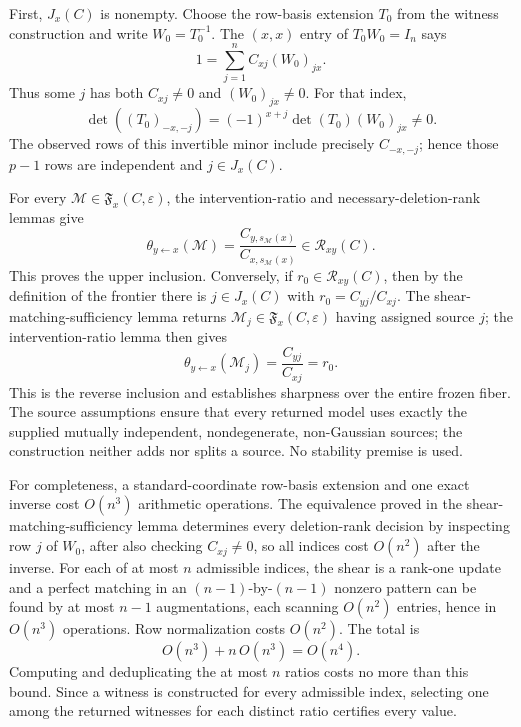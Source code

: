 First, \(J_x(C)\) is nonempty. Choose the row-basis extension \(T_0\) from the witness construction and write \(W_0=T_0^{-1}\). The \((x,x)\) entry of \(T_0W_0=I_n\) says
\[
 1=\sum_{j=1}^n C_{xj}(W_0)_{jx}.
\]
Thus some \(j\) has both \(C_{xj}\ne0\) and \((W_0)_{jx}\ne0\). For that index,
\[
 \det((T_0)_{-x,-j})=(-1)^{x+j}\det(T_0)(W_0)_{jx}\ne0.
\]
The observed rows of this invertible minor include precisely \(C_{-x,-j}\); hence those \(p-1\) rows are independent and \(j\in J_x(C)\).

For every \(\mathcal M\in\mathfrak F_x(C,\varepsilon)\), the intervention-ratio and necessary-deletion-rank lemmas give
\[
 \theta_{y\leftarrow x}(\mathcal M)
 =\frac{C_{y,s_{\mathcal M}(x)}}{C_{x,s_{\mathcal M}(x)}}
 \in\mathcal R_{xy}(C).
\]
This proves the upper inclusion. Conversely, if \(r_0\in\mathcal R_{xy}(C)\), then by the definition of the frontier there is \(j\in J_x(C)\) with \(r_0=C_{yj}/C_{xj}\). The shear-matching-sufficiency lemma returns \(\mathcal M_j\in\mathfrak F_x(C,\varepsilon)\) having assigned source \(j\); the intervention-ratio lemma then gives
\[
 \theta_{y\leftarrow x}(\mathcal M_j)=\frac{C_{yj}}{C_{xj}}=r_0.
\]
This is the reverse inclusion and establishes sharpness over the entire frozen fiber. The source assumptions ensure that every returned model uses exactly the supplied mutually independent, nondegenerate, non-Gaussian sources; the construction neither adds nor splits a source. No stability premise is used.

For completeness, a standard-coordinate row-basis extension and one exact inverse cost \(O(n^3)\) arithmetic operations. The equivalence proved in the shear-matching-sufficiency lemma determines every deletion-rank decision by inspecting row \(j\) of \(W_0\), after also checking \(C_{xj}\ne0\), so all indices cost \(O(n^2)\) after the inverse. For each of at most \(n\) admissible indices, the shear is a rank-one update and a perfect matching in an \((n-1)\)-by-\((n-1)\) nonzero pattern can be found by at most \(n-1\) augmentations, each scanning \(O(n^2)\) entries, hence in \(O(n^3)\) operations. Row normalization costs \(O(n^2)\). The total is
\[
 O(n^3)+n\,O(n^3)=O(n^4).
\]
Computing and deduplicating the at most \(n\) ratios costs no more than this bound. Since a witness is constructed for every admissible index, selecting one among the returned witnesses for each distinct ratio certifies every value.